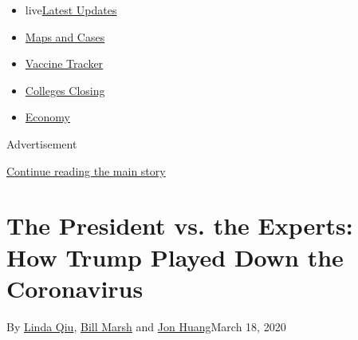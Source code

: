 \begin{itemize}
\tightlist
\item
  live\href{https://www.nytimes3xbfgragh.onion/2020/08/20/world/coronavirus-covid.html?name=styln-coronavirus-national\&region=TOP_BANNER\&variant=undefined\&block=storyline_menu_recirc\&action=click\&pgtype=Interactive\&impression_id=7f0c4ed1-e385-11ea-a6bd-919622e83b69}{Latest
  Updates}
\item
  \href{https://www.nytimes3xbfgragh.onion/interactive/2020/us/coronavirus-us-cases.html?name=styln-coronavirus-national\&region=TOP_BANNER\&variant=undefined\&block=storyline_menu_recirc\&action=click\&pgtype=Interactive\&impression_id=7f0c4ed2-e385-11ea-a6bd-919622e83b69}{Maps
  and Cases}
\item
  \href{https://www.nytimes3xbfgragh.onion/interactive/2020/science/coronavirus-vaccine-tracker.html?name=styln-coronavirus-national\&region=TOP_BANNER\&variant=undefined\&block=storyline_menu_recirc\&action=click\&pgtype=Interactive\&impression_id=7f0c4ed3-e385-11ea-a6bd-919622e83b69}{Vaccine
  Tracker}
\item
  \href{https://www.nytimes3xbfgragh.onion/2020/08/19/us/colleges-closing-covid.html?name=styln-coronavirus-national\&region=TOP_BANNER\&variant=undefined\&block=storyline_menu_recirc\&action=click\&pgtype=Interactive\&impression_id=7f0c75e0-e385-11ea-a6bd-919622e83b69}{Colleges
  Closing}
\item
  \href{https://www.nytimes3xbfgragh.onion/live/2020/08/20/business/stock-market-today-coronavirus?name=styln-coronavirus-national\&region=TOP_BANNER\&variant=undefined\&block=storyline_menu_recirc\&action=click\&pgtype=Interactive\&impression_id=7f0c75e1-e385-11ea-a6bd-919622e83b69}{Economy}
\end{itemize}

Advertisement

\protect\hyperlink{after-top}{Continue reading the main story}

\hypertarget{the-president-vs-the-experts-how-trump-played-down-the-coronavirus}{%
\section{The President vs. the Experts: How Trump Played Down the
Coronavirus}\label{the-president-vs-the-experts-how-trump-played-down-the-coronavirus}}

By \href{https://www.nytimes3xbfgragh.onion/by/linda-qiu}{Linda Qiu},
\href{https://www.nytimes3xbfgragh.onion/by/bill-marsh}{Bill Marsh} and
\href{https://www.nytimes3xbfgragh.onion/by/jon-huang}{Jon Huang}March
18, 2020

